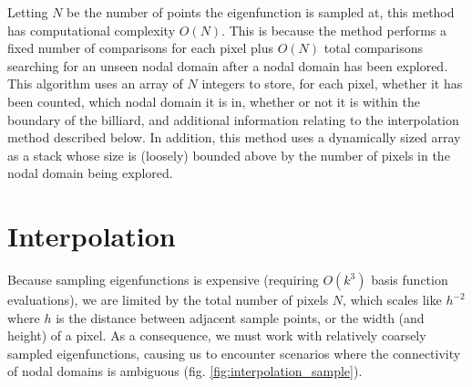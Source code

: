\documentclass{report}
\begin{document}
Letting $N$ be the number of points the eigenfunction is sampled at, this method has computational complexity $O(N)$. This is because the method performs a fixed number of comparisons for each pixel plus $O(N)$ total comparisons searching for an unseen nodal domain after a nodal domain has been explored. This algorithm uses an array of $N$ integers to store, for each pixel, whether it has been counted, which nodal domain it is in, whether or not it is within the boundary of the billiard, and additional information relating to the interpolation method described below. In addition, this method uses a dynamically sized array as a stack whose size is (loosely) bounded above by the number of pixels in the nodal domain being explored.

\section{Interpolation}
\label{sec:interpolation}
Because sampling eigenfunctions is expensive (requiring $O(k^{3})$ basis function evaluations), we are limited by the total number of pixels $N$, which scales like $h^{-2}$ where $h$ is the distance between adjacent sample points, or the width (and height) of a pixel. As a consequence, we must work with relatively coarsely sampled eigenfunctions, causing us to encounter scenarios where the connectivity of nodal domains is ambiguous (fig. \ref{fig:interpolation_sample}).
\end{document}
